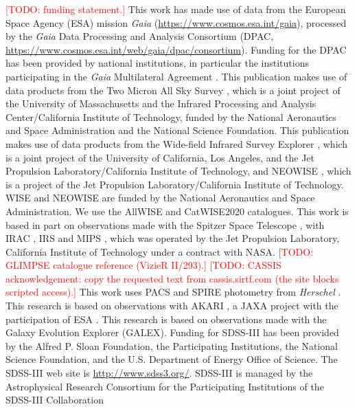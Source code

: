\documentclass{aa}
\newcommand{\todo}[1]{\textcolor{red}{[TODO: #1]}}
\begin{document}
\begin{acknowledgements}
\todo{funding statement.}
This work has made use of data from the European Space Agency (ESA) mission
{\it Gaia} (\url{https://www.cosmos.esa.int/gaia}), processed by the {\it Gaia}
Data Processing and Analysis Consortium (DPAC,
\url{https://www.cosmos.esa.int/web/gaia/dpac/consortium}). Funding for the DPAC
has been provided by national institutions, in particular the institutions
participating in the {\it Gaia} Multilateral Agreement
\citep{gaiacollaboration2016,gaia2023}.
This publication makes use of data products from the Two Micron All Sky Survey
\citep{skrutskie2006}, which is a joint project of the University of
Massachusetts and the Infrared Processing and Analysis Center/California
Institute of Technology, funded by the National Aeronautics and Space
Administration and the National Science Foundation.
This publication makes use of data products from the Wide-field Infrared Survey
Explorer \citep{wright2010}, which is a joint project of the University of
California, Los Angeles, and the Jet Propulsion Laboratory/California Institute
of Technology, and NEOWISE \citep{mainzer2011}, which is a project of the Jet
Propulsion Laboratory/California Institute of Technology. WISE and NEOWISE are
funded by the National Aeronautics and Space Administration. We use the AllWISE
and CatWISE2020 \citep{marocco2021} catalogues.
This work is based in part on observations made with the Spitzer Space Telescope
\citep{werner2004}, with IRAC \citep{fazio2004}, IRS \citep{houck2004} and MIPS
\citep{rieke2004}, which was operated by the Jet Propulsion Laboratory,
California Institute of Technology under a contract with NASA.
\todo{GLIMPSE catalogue reference (VizieR II/293).}
\todo{CASSIS acknowledgement: copy the requested text from cassis.sirtf.com
(the site blocks scripted access).}
This work uses PACS \citep{poglitsch2010} and SPIRE \citep{griffin2010}
photometry from {\it Herschel} \citep{pilbratt2010}.
This research is based on observations with AKARI \citep{murakami2007}, a JAXA
project with the participation of ESA \citep{ishihara2010,doi2015}.
This research is based on observations made with the Galaxy Evolution Explorer
(GALEX).
Funding for SDSS-III has been provided by the Alfred P. Sloan Foundation, the
Participating Institutions, the National Science Foundation, and the U.S.
Department of Energy Office of Science. The SDSS-III web site is
\url{http://www.sdss3.org/}. SDSS-III is managed by the Astrophysical Research
Consortium for the Participating Institutions of the SDSS-III Collaboration

\end{acknowledgements}
\end{document}
